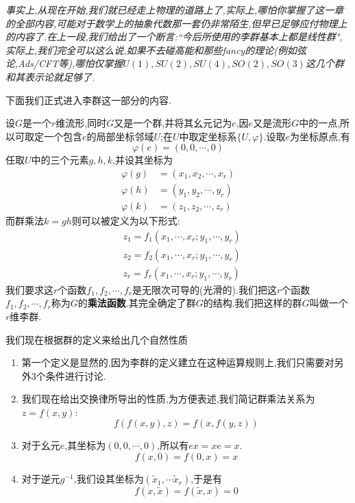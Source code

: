 \begin{remark}
	\textit{事实上,从现在开始,我们就已经走上物理的道路上了,实际上,哪怕你掌握了这一章的全部内容,可能对于数学上的抽象代数那一套仍非常陌生,但早已足够应付物理上的内容了.在上一段,我们给出了一个断言:``今后所使用的李群基本上都是线性群",实际上,我们完全可以这么说,如果不去碰高能和那些fancy的理论(例如弦论,Ads/CFT等),哪怕仅掌握$U(1),SU(2),SU(4),SO(2),SO(3)$这几个群和其表示论就足够了.}
\end{remark}
下面我们正式进入李群这一部分的内容.
\begin{definition}[Lie群的定义]
	设$G$是一个$r$维流形,同时$G$又是一个群,并将其幺元记为$e$,因$e$又是流形$G$中的一点,所以可取定一个包含$e$的局部坐标邻域$U$;在$U$中取定坐标系$\{U,\varphi\}$.设取$e$为坐标原点,有
	\begin{equation}
		\varphi(e)=(0,0,\cdots,0)
	\end{equation}
	任取$U$中的三个元素$g,h,k$,并设其坐标为
	\begin{equation}
		\begin{aligned}
			\varphi(g)&=(x_1,x_2,\cdots,x_r)\\
			\varphi(h)&=(y_1,y_2,\cdots,y_r)\\
			\varphi(k)&=(z_1,z_2,\cdots,z_r)
		\end{aligned}
	\end{equation}
	而群乘法$k=gh$则可以被定义为以下形式:
	\begin{equation}
		\begin{aligned}
			&z_{1}=f_{1}(x_{1},\cdots,x_{r};y_{1},\cdots,y_{r})\\
			&z_{2}=f_{2}(x_{1},\cdots,x_{r};y_{1},\cdots,y_{r})\\
			&z_{r} =f_r(x_1,\cdots,x_r;y_1,\cdots,y_r) 
		\end{aligned}
	\end{equation}
	我们要求这$r$个函数$f_1,f_2,\cdots,f_r$是无限次可导的(光滑的).我们把这$r$个函数$f_1,f_2,\cdots,f_r$称为$G$的\textbf{乘法函数}.其完全确定了群$G$的结构.我们把这样的群$G$叫做一个$r$维李群.
\end{definition}
我们现在根据群的定义来给出几个自然性质
\begin{enumerate}
	\item 第一个定义是显然的,因为李群的定义建立在这种运算规则上,我们只需要对另外3个条件进行讨论.
	\item 我们现在给出交换律所导出的性质,为方便表述,我们简记群乘法关系为$z=f(x,y)$:
	\begin{equation}
		f(f(x,y),z)=f(x,f(y,z))
	\end{equation}
	\item 对于幺元$e$,其坐标为$(0,0,\cdots,0)$,所以有$ex=xe=x$.
	\begin{equation}
		f(x,0)=f(0,x)=x
	\end{equation}
	\item 对于逆元$g^{-1}$,我们设其坐标为$(\tilde{x}_1,\cdots\tilde{x}_r)$,于是有
	\begin{equation}
		f(x,\tilde{x})=f(\tilde{x},x)=0
	\end{equation}
\end{enumerate}
